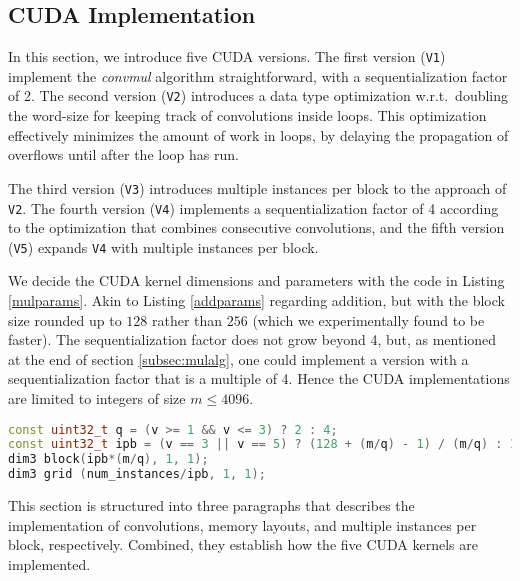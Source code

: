 \subsection{CUDA Implementation}
\label{subsec:mulcud}

In this section, we introduce five CUDA versions. The first version
(\texttt{V1}) implement the \textit{convmul} algorithm straightforward, with a
sequentialization factor of 2. The second version (\texttt{V2}) introduces a
data type optimization w.r.t.\ doubling the word-size for keeping track of
convolutions inside loops. This optimization effectively minimizes the amount of
work in loops, by delaying the propagation of overflows until after the loop
has run.

The third version (\texttt{V3}) introduces multiple instances per block to the
approach of \texttt{V2}. The fourth version (\texttt{V4}) implements a
sequentialization factor of 4 according to the optimization that combines
consecutive convolutions, and the fifth version (\texttt{V5}) expands
\texttt{V4} with multiple instances per block.

We decide the CUDA kernel dimensions and parameters with the code in Listing
\ref{mulparams}. Akin to Listing \ref{addparams} regarding addition, but with
the block size rounded up to $128$ rather than $256$ (which we experimentally
found to be faster). The sequentialization factor does not grow beyond 4, but,
as mentioned at the end of section \ref{subsec:mulalg}, one could implement a
version with a sequentialization factor that is a multiple of 4. Hence the CUDA
implementations are limited to integers of size $m\leq4096$.

\begin{lstlisting}[language=CPP,caption={\footnotesize CUDA multiplication parameters and dimensions for version $v$ with size $m$ and $num\_instances$.},label={mulparams}]
const uint32_t q = (v >= 1 && v <= 3) ? 2 : 4;
const uint32_t ipb = (v == 3 || v == 5) ? (128 + (m/q) - 1) / (m/q) : 1;
dim3 block(ipb*(m/q), 1, 1);
dim3 grid (num_instances/ipb, 1, 1);
\end{lstlisting}

This section is structured into three paragraphs that describes the
implementation of convolutions, memory layouts, and multiple instances per
block, respectively. Combined, they establish how the five CUDA kernels are
implemented.

